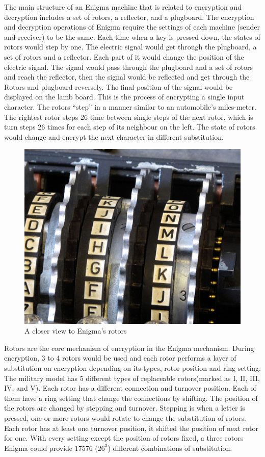 The main structure of an Enigma machine that is related to encryption and decryption includes a set of rotors, a reflector, and a plugboard. The encryption and decryption operations of Enigma require the settings of each machine (sender and receiver) to be the same. Each time when a key is pressed down, the states of rotors would step by one. The electric signal would get through the plugboard, a set of rotors and a reflector. Each part of it would change the position of the electric signal.  The signal would pass through the plugboard and a set of rotors and reach the reflector, then the signal would be reflected and get through the Rotors and plugboard reversely. The final position of the signal would be displayed on the lamb board. This is the process of encrypting a single input character. The rotors “step” in a manner similar to an automobile's miles-meter. The rightest rotor steps 26 time between single steps of the next rotor, which is turn steps 26 times for each step of its neighbour on the left. The state of rotors would change and encrypt the next character in different substitution.


\begin{figure}[hbt!]
    \centering
    \includegraphics[width=0.5\linewidth]{figures/rotors.png}
    \caption{A closer view to Enigma's rotors}
    \label{fig:graph}
\end{figure}


Rotors are the core mechanism of encryption in the Enigma mechanism. During encryption, 3 to 4 rotors would be used and each rotor performs a layer of substitution on encryption depending on its types, rotor position and ring setting. The military model has 5 different types of replaceable rotors(marked as I, II, III, IV, and V). Each rotor has a different connection and turnover position. Each of them have a ring setting that change the connections by shifting. The position of the rotors are changed by stepping and turnover. Stepping is when a letter is pressed, one or more rotors would rotate to change the substitution of rotors. Each rotor has at least one turnover position, it shifted the position of next rotor for one. With every setting except the position of rotors fixed, a three rotors Enigma could provide 17576 (\(26^3\)) different combinations of substitution.

